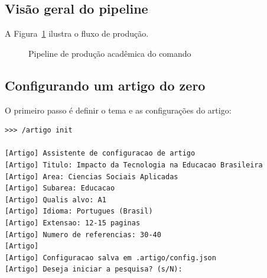 \subsection{Visão geral do pipeline}
\label{subsec:pipeline-artigo}

A Figura~\ref{fig:pipeline-artigo} ilustra o fluxo de produção.

\begin{figure}[htb]
\centering
{}
\caption{Pipeline de produção acadêmica do comando }
\label{fig:pipeline-artigo}
\end{figure}

\subsection{Configurando um artigo do zero}
\label{subsec:config-artigo}

O primeiro passo é definir o tema e as configurações do artigo:

\begin{lstlisting}[style=bashstyle, caption={Iniciando a produção de um
artigo}, label={lst:artigo-init}]
>>> /artigo init

[Artigo] Assistente de configuracao de artigo
[Artigo] Titulo: Impacto da Tecnologia na Educacao Brasileira
[Artigo] Area: Ciencias Sociais Aplicadas
[Artigo] Subarea: Educacao
[Artigo] Qualis alvo: A1
[Artigo] Idioma: Portugues (Brasil)
[Artigo] Extensao: 12-15 paginas
[Artigo] Numero de referencias: 30-40
[Artigo] 
[Artigo] Configuracao salva em .artigo/config.json
[Artigo] Deseja iniciar a pesquisa? (s/N):
\end{lstlisting}

